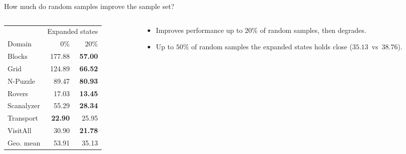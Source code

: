 \documentclass[10pt]{beamer}
\begin{document}
\begin{frame}{\small How much do random samples improve the sample set?} %
\begin{columns}
\begin{column}{0.5\textwidth}
    \begin{table}[]
    \begin{tabular}{l|rr}
        & \multicolumn{2}{c}{Expanded states} \\
        Domain & $0$\% & $20$\% \\
        \hline
        Blocks & 177.88 & \textbf{57.00} \\
        Grid & 124.89 & \textbf{66.52} \\
        N-Puzzle & 89.47 & \textbf{80.93} \\
        Rovers & 17.03 & \textbf{13.45} \\
        Scanalyzer & 55.29 & \textbf{28.34} \\
        Transport & \textbf{22.90} & 25.95 \\
        VisitAll & 30.90 & \textbf{21.78} \\
        \hline
        Geo. mean & 53.91 & 35.13 \\
    \end{tabular}
    \end{table}
\end{column}
\begin{column}{0.5\textwidth}
    \begin{itemize}
        \item Improves performance up to $20$\% of random samples, then degrades.
        \item Up to $50$\% of random samples the expanded states holds close ($35.13$~vs~$38.76$).
    \end{itemize}
\end{column}
\end{columns}
\end{frame}
\end{document}
